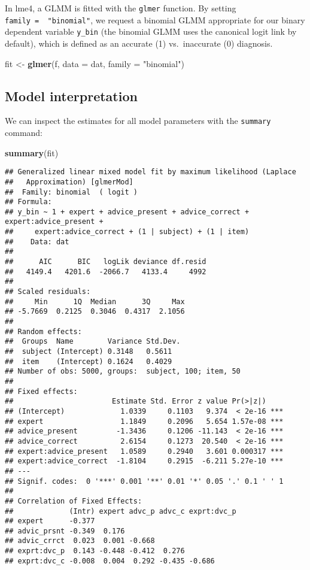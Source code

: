 \documentclass[
  man,floatsintext]{apa6}
\newenvironment{Shaded}{\begin{snugshade}}{\end{snugshade}}
\newcommand{\AttributeTok}[1]{\textcolor[rgb]{0.13,0.29,0.53}{#1}}
\newcommand{\FunctionTok}[1]{\textcolor[rgb]{0.13,0.29,0.53}{\textbf{#1}}}
\newcommand{\NormalTok}[1]{#1}
\newcommand{\OtherTok}[1]{\textcolor[rgb]{0.56,0.35,0.01}{#1}}
\newcommand{\StringTok}[1]{\textcolor[rgb]{0.31,0.60,0.02}{#1}}
\begin{document}
In lme4, a GLMM is fitted with the \texttt{glmer} function. By setting \texttt{family\ =\ \ "binomial"}, we request a binomial GLMM appropriate for our binary dependent variable \texttt{y\_bin} (the binomial GLMM uses the canonical logit link by default), which is defined as an accurate (1) vs.~inaccurate (0) diagnosis.

\begin{Shaded}
\begin{Highlighting}[]
\NormalTok{fit }\OtherTok{\textless{}{-}} \FunctionTok{glmer}\NormalTok{(f, }\AttributeTok{data =}\NormalTok{ dat, }\AttributeTok{family =} \StringTok{"binomial"}\NormalTok{)}
\end{Highlighting}
\end{Shaded}

\hypertarget{model-interpretation}{%
\subsection{Model interpretation}\label{model-interpretation}}

We can inspect the estimates for all model parameters with the \texttt{summary} command:

\begin{Shaded}
\begin{Highlighting}[]
\FunctionTok{summary}\NormalTok{(fit)}
\end{Highlighting}
\end{Shaded}

\begin{verbatim}
## Generalized linear mixed model fit by maximum likelihood (Laplace
##   Approximation) [glmerMod]
##  Family: binomial  ( logit )
## Formula: 
## y_bin ~ 1 + expert + advice_present + advice_correct + expert:advice_present +  
##     expert:advice_correct + (1 | subject) + (1 | item)
##    Data: dat
## 
##      AIC      BIC   logLik deviance df.resid 
##   4149.4   4201.6  -2066.7   4133.4     4992 
## 
## Scaled residuals: 
##     Min      1Q  Median      3Q     Max 
## -5.7669  0.2125  0.3046  0.4317  2.1056 
## 
## Random effects:
##  Groups  Name        Variance Std.Dev.
##  subject (Intercept) 0.3148   0.5611  
##  item    (Intercept) 0.1624   0.4029  
## Number of obs: 5000, groups:  subject, 100; item, 50
## 
## Fixed effects:
##                       Estimate Std. Error z value Pr(>|z|)    
## (Intercept)             1.0339     0.1103   9.374  < 2e-16 ***
## expert                  1.1849     0.2096   5.654 1.57e-08 ***
## advice_present         -1.3436     0.1206 -11.143  < 2e-16 ***
## advice_correct          2.6154     0.1273  20.540  < 2e-16 ***
## expert:advice_present   1.0589     0.2940   3.601 0.000317 ***
## expert:advice_correct  -1.8104     0.2915  -6.211 5.27e-10 ***
## ---
## Signif. codes:  0 '***' 0.001 '**' 0.01 '*' 0.05 '.' 0.1 ' ' 1
## 
## Correlation of Fixed Effects:
##             (Intr) expert advc_p advc_c exprt:dvc_p
## expert      -0.377                                 
## advic_prsnt -0.349  0.176                          
## advic_crrct  0.023  0.001 -0.668                   
## exprt:dvc_p  0.143 -0.448 -0.412  0.276            
## exprt:dvc_c -0.008  0.004  0.292 -0.435 -0.686
\end{verbatim}
\end{document}
